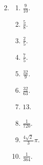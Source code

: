 \begin{enumerate}
\begin{multicols}{2}
\begin{enumerate}[label*=\arabic*.]
            \end{enumerate}
        \end{multicols}
    \item
        \begin{multicols}{2}
            \begin{enumerate}[label*=\arabic*.]
                \item $\frac{9}{10}$.
                \item $\frac{5}{8}$.
                \item $\frac{2}{5}$.
                \item $\frac{7}{5}$.
                \item $\frac{32}{9}$.
                \item $\frac{32}{63}$.
                \item $13$.
                \item $\frac{1}{720}$.
                \item $\frac{4 \sqrt{2}\, }{3}\pi$.
                \item $\frac{1}{364}$.
            \end{enumerate}
        \end{multicols}
\end{enumerate}
